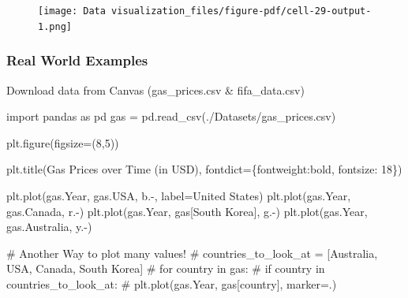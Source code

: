 \documentclass[
  letterpaper,
  DIV=11,
  numbers=noendperiod]{scrreprt}
\newenvironment{Shaded}{\begin{snugshade}}{\end{snugshade}}
\newcommand{\CommentTok}[1]{\textcolor[rgb]{0.37,0.37,0.37}{#1}}
\newcommand{\DecValTok}[1]{\textcolor[rgb]{0.68,0.00,0.00}{#1}}
\newcommand{\ImportTok}[1]{\textcolor[rgb]{0.00,0.46,0.62}{#1}}
\newcommand{\NormalTok}[1]{\textcolor[rgb]{0.00,0.23,0.31}{#1}}
\newcommand{\OperatorTok}[1]{\textcolor[rgb]{0.37,0.37,0.37}{#1}}
\newcommand{\StringTok}[1]{\textcolor[rgb]{0.13,0.47,0.30}{#1}}
\begin{document}
\begin{figure}[H]

{\centering \texttt{[image: Data visualization\_files/figure-pdf/cell-29-output-1.png]}

}

\end{figure}

\hypertarget{real-world-examples}{%
\subsubsection{Real World Examples}\label{real-world-examples}}

Download data from Canvas (gas\_prices.csv \& fifa\_data.csv)

\begin{Shaded}
\begin{Highlighting}[]
\ImportTok{import}\NormalTok{ pandas }\ImportTok{as}\NormalTok{ pd}
\NormalTok{gas }\OperatorTok{=}\NormalTok{ pd.read\_csv(}\StringTok{\textquotesingle{}./Datasets/gas\_prices.csv\textquotesingle{}}\NormalTok{)}

\NormalTok{plt.figure(figsize}\OperatorTok{=}\NormalTok{(}\DecValTok{8}\NormalTok{,}\DecValTok{5}\NormalTok{))}

\NormalTok{plt.title(}\StringTok{\textquotesingle{}Gas Prices over Time (in USD)\textquotesingle{}}\NormalTok{, fontdict}\OperatorTok{=}\NormalTok{\{}\StringTok{\textquotesingle{}fontweight\textquotesingle{}}\NormalTok{:}\StringTok{\textquotesingle{}bold\textquotesingle{}}\NormalTok{, }\StringTok{\textquotesingle{}fontsize\textquotesingle{}}\NormalTok{: }\DecValTok{18}\NormalTok{\})}

\NormalTok{plt.plot(gas.Year, gas.USA, }\StringTok{\textquotesingle{}b.{-}\textquotesingle{}}\NormalTok{, label}\OperatorTok{=}\StringTok{\textquotesingle{}United States\textquotesingle{}}\NormalTok{)}
\NormalTok{plt.plot(gas.Year, gas.Canada, }\StringTok{\textquotesingle{}r.{-}\textquotesingle{}}\NormalTok{)}
\NormalTok{plt.plot(gas.Year, gas[}\StringTok{\textquotesingle{}South Korea\textquotesingle{}}\NormalTok{], }\StringTok{\textquotesingle{}g.{-}\textquotesingle{}}\NormalTok{)}
\NormalTok{plt.plot(gas.Year, gas.Australia, }\StringTok{\textquotesingle{}y.{-}\textquotesingle{}}\NormalTok{)}

\CommentTok{\# Another Way to plot many values!}
\CommentTok{\# countries\_to\_look\_at = [\textquotesingle{}Australia\textquotesingle{}, \textquotesingle{}USA\textquotesingle{}, \textquotesingle{}Canada\textquotesingle{}, \textquotesingle{}South Korea\textquotesingle{}]}
\CommentTok{\# for country in gas:}
\CommentTok{\#     if country in countries\_to\_look\_at:}
\CommentTok{\#         plt.plot(gas.Year, gas[country], marker=\textquotesingle{}.\textquotesingle{})}


\end{Highlighting}
\end{Shaded}
\end{document}
